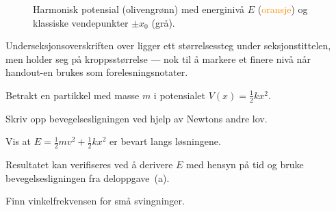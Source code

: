 \documentclass[11pt]{article}
\begin{document}
\begin{figure}[ht]
  \centering
  \caption{Harmonisk potensial (\textcolor{darkolive}{olivengrønn}) med
           energinivå $E$ (\textcolor{darkorange}{oransje}) og klassiske
           vendepunkter $\pm x_0$ (grå).}
  \label{fig:potensial}
\end{figure}

Underseksjonsoverskriften over ligger ett størrelsessteg under
seksjonstittelen, men holder seg på kroppsstørrelse --- nok til
å markere et finere nivå når handout-en brukes som
forelesningsnotater.


\begin{oppgave}
Betrakt en partikkel med masse $m$ i potensialet
$V(x) = \tfrac{1}{2}kx^2$.

\begin{deloppgaver}
  \item Skriv opp bevegelsesligningen ved hjelp av Newtons
        andre lov.
  \item Vis at
        $E = \tfrac{1}{2}mv^2 + \tfrac{1}{2}kx^2$
        er bevart langs løsningene.
\end{deloppgaver}

Resultatet kan verifiseres ved å derivere $E$ med hensyn på
tid og bruke bevegelsesligningen fra deloppgave~(a).

\begin{deloppgaver}[resume]
  \item Finn vinkelfrekvensen for små svingninger.
\end{deloppgaver}
\end{oppgave}
\end{document}
